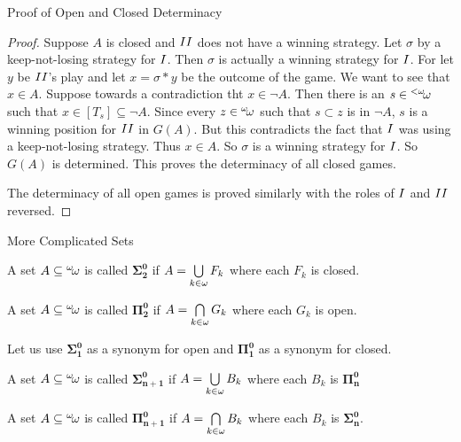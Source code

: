 \documentclass[pdf,final]{prosper}
\newcommand{\skipsmall}{\vspace{1em}}
\begin{document}
\begin{slide}{Proof of Open and Closed Determinacy}

\begin{proof}
Suppose $A$ is closed and $II$ does not have a winning strategy. Let $\sigma$
by a keep-not-losing strategy for $I$. Then $\sigma$ is actually a winning
strategy for $I$. For let $y$ be $II$'s play and let $x=\sigma*y$ be the
outcome of the game. We want to see that $x\in A$. Suppose towards a
contradiction tht $x\in\neg A$. Then
there is an $s\in{}^{<\omega}\!{\omega}$ such that $x\in[T_s]\subseteq\neg A$. Since every
$z\in{}^{\omega}\!{\omega}$ such that $s\subset z$ is in $\neg A$,  $s$ is a winning
position for $II$ in $G(A)$. But this contradicts the fact that $I$ was
using a keep-not-losing strategy. Thus $x\in A$. So $\sigma$ is a winning
strategy for $I$. So $G(A)$ is determined. This proves the determinacy of all
closed games.

\skipsmall

The determinacy of all open games is proved similarly with the roles of $I$
and $II$ reversed.
\end{proof}
\end{slide}

\begin{slide}{More Complicated Sets}
\begin{definition}
A set $A\subseteq{}^{\omega}\!{\omega}$ is called $\mathbf{\Sigma^0_2}$ if
$A=\bigcup\limits_{k\in\omega}F_k$ where each $F_k$ is closed.

\skipsmall

A set $A\subseteq{}^{\omega}\!{\omega}$ is called $\mathbf{\Pi^0_2}$ if
$A=\bigcap\limits_{k\in\omega}G_k$ where each $G_k$ is open.
\end{definition}

\skipsmall

\begin{definition}
Let us use $\mathbf{\Sigma^0_1}$ as a synonym for open and $\mathbf{\Pi^0_1}$ as
a synonym for closed.

\skipsmall

 A set $A\subseteq{}^{\omega}\!{\omega}$ is called $\mathbf{\Sigma^0_{n+1}}$
if $A=\bigcup\limits_{k\in\omega}B_k$ where each $B_k$ is $\mathbf{\Pi^0_{n}}$

\skipsmall

A set $A\subseteq{}^{\omega}\!{\omega}$ is called $\mathbf{\Pi^0_{n+1}}$ if
$A=\bigcap\limits_{k\in\omega}B_k$ where each $B_k$ is $\mathbf{\Sigma^0_{n}}$.
\end{definition}

\end{slide}
\end{document}
